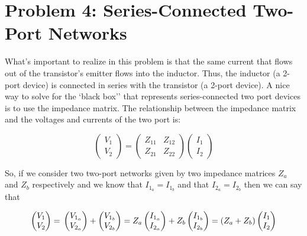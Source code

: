 \section*{Problem 4: Series-Connected Two-Port Networks}
\setcounter{equation}{0}
\addtocounter{section}{1}

What's important to realize in this problem is that the same current that flows
out of the transistor's emitter flows into the inductor. Thus, the inductor (a
2-port device) is connected in series with the transistor (a 2-port device). A
nice way to solve for the `black box'' that represents series-connected two port
devices is to use the impedance matrix. The relationship between the impedance
matrix and the voltages and currents of the two port is:

\[ 
    \begin{pmatrix} V_1 \\ V_2 \end{pmatrix} =
    \begin{pmatrix} Z_{11} & Z_{12} \\ Z_{21} & Z_{22} \end{pmatrix} 
    \begin{pmatrix} I_1 \\ I_2 \end{pmatrix}
\]

So, if we consider two two-port networks given by two impedance matrices $Z_a$
and $Z_b$ respectively and we know that $I_{1_a} = I_{1_b}$ and that $I_{2_a} =
I_{2_b}$
then we can say that

\[ 
    \begin{pmatrix} V_{1} \\ V_{2} \end{pmatrix} =  \\
    \begin{pmatrix} V_{1_a} \\ V_{2_a} \end{pmatrix} + \begin{pmatrix} V_{1_b} \\
    V_{2_b} \end{pmatrix} =
    Z_a \begin{pmatrix} I_{1_a} \\ I_{2_a} \end{pmatrix} + Z_b \begin{pmatrix}
    I_{1_b} \\ I_{2_b} \end{pmatrix} =
    \left( Z_a+Z_b \right) \begin{pmatrix} I_{1} \\ I_{2} \end{pmatrix}
\]

